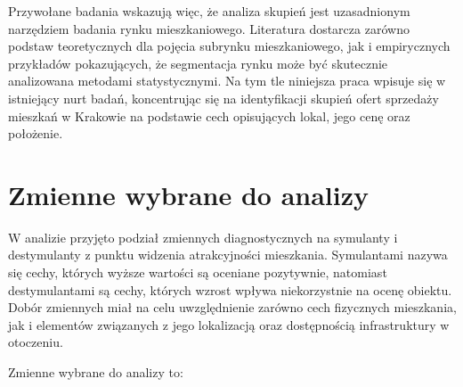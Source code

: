 \documentclass{report}
\begin{document}
Przywołane badania wskazują więc, że analiza skupień jest uzasadnionym narzędziem badania rynku mieszkaniowego. Literatura dostarcza zarówno podstaw teoretycznych dla pojęcia subrynku mieszkaniowego, jak i empirycznych przykładów pokazujących, że segmentacja rynku może być skutecznie analizowana metodami statystycznymi. Na tym tle niniejsza praca wpisuje się w istniejący nurt badań, koncentrując się na identyfikacji skupień ofert sprzedaży mieszkań w Krakowie na podstawie cech opisujących lokal, jego cenę oraz położenie.




\section{Zmienne wybrane do analizy}

W analizie przyjęto podział zmiennych diagnostycznych na symulanty i destymulanty z punktu widzenia atrakcyjności mieszkania. Symulantami nazywa się cechy, których wyższe wartości są oceniane pozytywnie, natomiast destymulantami są cechy, których wzrost wpływa niekorzystnie na ocenę obiektu. Dobór zmiennych miał na celu uwzględnienie zarówno cech fizycznych mieszkania, jak i elementów związanych z jego lokalizacją oraz dostępnością infrastruktury w otoczeniu.

\medskip

Zmienne wybrane do analizy to:
\end{document}
